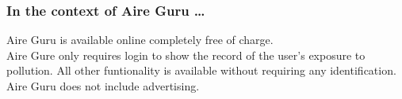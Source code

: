 \subsubsection*{In the context of Aire Guru \ldots} 

Aire Guru is available online completely free of charge. \\

Aire Gure only requires login to show the record of the user's exposure to pollution. All other funtionality is available without requiring any identification. \\

Aire Guru does not include advertising.